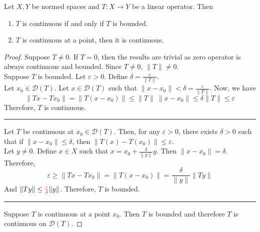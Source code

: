 \begin{theorem}
	Let $X,Y$ be normed spaces and $T : X \to Y$ be a linear operator.
	Then
	\begin{enumerate}
		\item $T$ is continuous if and only if $T$ is bounded.
		\item $T$ is continuous at a point, then it is continuous.
	\end{enumerate}
\end{theorem}
\begin{proof}
	Suppose $T \ne 0$.
	If $T = 0$, then the results are trivial as zero operator is always continuous and bounded.
	Since $T \ne 0$, $\|T\| \ne 0$.\\

	Suppose $T$ is bounded.
	Let $\varepsilon > 0$.
	Define $\delta = \frac{\varepsilon}{\|T\|}$.\\
	Let $x_0 \in \mathscr{D}(T)$.
	Let $x \in \mathscr{D}(T)$ such that $\| x - x_0 \| < \delta = \frac{\varepsilon}{\|T\|}$.
	Now, we have
	\[ \| Tx - Tx_0 \| = \| T(x-x_0) \| \le \|T\| \ \|x-x_0\| \le \delta \|T\| \le \varepsilon \]
	Therefore, $T$ is continuous. \\

	\hrule \vspace{1em}

	Let $T$ be continuous at $x_0 \in \mathscr{D}(T)$.
	Then, for any $\varepsilon > 0$, there exists $\delta > 0$ such that if $\|x-x_0\| \le \delta$, then $\|T(x) - T(x_0)\| \le \varepsilon$.\\

	Let $y \ne 0$.
	Define $x \in X$ such that $x = x_0 + \frac{\delta}{\|y\|}y$.
	Then $\| x-x_0 \| = \delta $.
	Therefore,
	\[ \varepsilon \ge \|Tx - Tx_0\| = \| T(x-x_0) \| = \frac{\delta}{\|y\|} \|Ty\| \]
	And $\|Ty\| \le {\color{red}\frac{\varepsilon}{\delta}} \|y\|$.
	Therefore, $T$ is bounded.\\

	\hrule \vspace{1em}

	Suppose $T$ is continuous at a point $x_0$.
	Then $T$ is bounded and therefore $T$ is continuous on $\mathscr{D}(T)$.
\end{proof}

